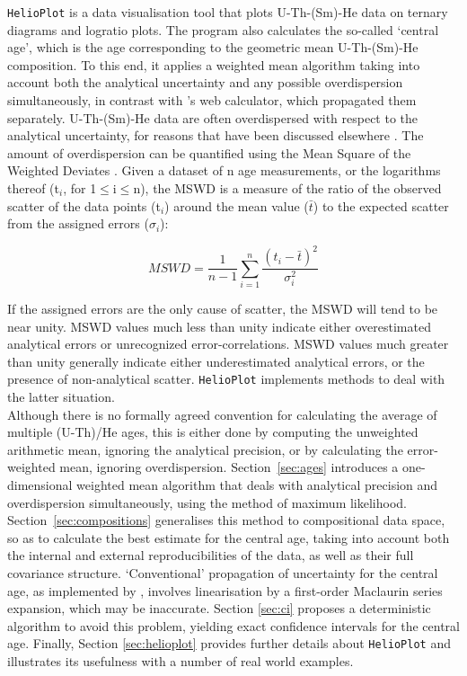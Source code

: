 \documentclass{article}
\begin{document}
{\tt HelioPlot} is a data visualisation tool that plots U-Th-(Sm)-He
data on ternary diagrams and logratio plots.  The program also
calculates the so-called `central age', which is the age corresponding
to the geometric mean U-Th-(Sm)-He composition. To this end, it
applies a weighted mean algorithm taking into account both the
analytical uncertainty and any possible overdispersion simultaneously,
in contrast with \citet{vermeesch2008a}'s web calculator, which
propagated them separately. U-Th-(Sm)-He data are often overdispersed
with respect to the analytical uncertainty, for reasons that have been
discussed elsewhere \citep{fitzgerald2006, shuster2006}. The amount of
overdispersion can be quantified using the Mean Square of the Weighted
Deviates \citep[MSWD, ][]{mcintyre1966}.  Given a dataset of n age
measurements, or the logarithms thereof (t$_i$, for 1$\leq$i$\leq$n),
the MSWD is a measure of the ratio of the observed scatter of the data
points (t$_i$) around the mean value ($\bar{t}$) to the expected
scatter from the assigned errors ($\sigma_i$):

\begin{equation}
MSWD = \frac{1}{n-1} \sum_{i=1}^n \frac{(t_i - \bar{t})^2}{\sigma_i^2}
\label{eq:MSWDt}
\end{equation}

If the assigned errors are the only cause of scatter, the MSWD will
tend to be near unity.  MSWD values much less than unity indicate
either overestimated analytical errors or unrecognized
error-correlations.  MSWD values much greater than unity generally
indicate either underestimated analytical errors, or the presence of
non-analytical scatter. {\tt HelioPlot} implements methods to deal
with the latter situation.\\

Although there is no formally agreed convention for calculating the
average of multiple (U-Th)/He ages, this is either done by computing
the unweighted arithmetic mean, ignoring the analytical precision, or
by calculating the error-weighted mean, ignoring overdispersion.
Section~\ref{sec:ages} introduces a one-dimensional weighted mean
algorithm that deals with analytical precision and overdispersion
simultaneously, using the method of maximum likelihood.
Section~\ref{sec:compositions} generalises this method to
compositional data space, so as to calculate the best estimate for the
central age, taking into account both the internal and external
reproducibilities of the data, as well as their full covariance
structure.  `Conventional' propagation of uncertainty for the central
age, as implemented by \citet{vermeesch2008a}, involves linearisation
by a first-order Maclaurin series expansion, which may be inaccurate.
Section \ref{sec:ci} proposes a deterministic algorithm to avoid this
problem, yielding exact confidence intervals for the central age.
Finally, Section \ref{sec:helioplot} provides further details about
{\tt HelioPlot} and illustrates its usefulness with a number of real
world examples.
\end{document}
